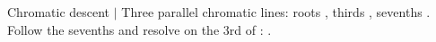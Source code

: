 \begin{patternbox}{Chromatic descent   }{  $|$  }
Three parallel chromatic lines: roots , thirds ,
sevenths . Follow the sevenths and resolve on the 3rd of :
.
\patternwhereline
\end{patternbox}
